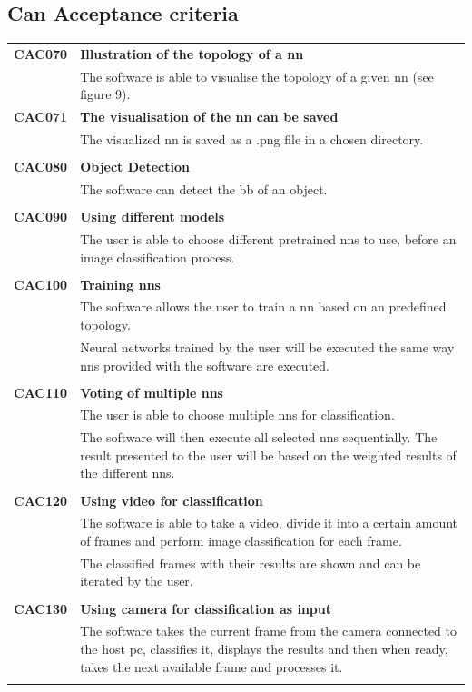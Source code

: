 \documentclass[parskip=full]{scrartcl}
\begin{document}
\subsection{Can Acceptance criteria}
\begin{tabular}{p{2cm}p{11.4cm}}
\textbf{CAC070} \hypertarget{CAC070} & \textbf{Illustration of the topology of a \gls{nn}} \\
& The software is able to visualise the topology of a given \gls{nn} (see figure 9). \\
\textbf{CAC071} \hypertarget{CAC071} & \textbf{The visualisation of the \gls{nn} can be saved}\\
& The visualized \gls{nn} is saved as a .png file in a chosen directory.\\
& \\
\textbf{CAC080} \hypertarget{CAC080} & \textbf{Object Detection} \\
& The software can detect the \gls{bb} of an object. \\ 
& \\
\textbf{CAC090} \hypertarget{CAC090} &  \textbf{Using different models}\\
& The user is able to choose different pretrained \glspl{nn} to use, before an \gls{image classification} process. \\
& \\
\textbf{CAC100} \hypertarget{CAC100} & \textbf{Training \glspl{nn}} \\
& The software allows the user to train a \gls{nn} based on an predefined topology.\\
& Neural networks trained by the user will be executed the same way \glspl{nn} provided with the software are executed.\\
& \\
\textbf{CAC110} \hypertarget{CAC110} & \textbf{Voting of multiple \glspl{nn}} \\
& The user is able to choose multiple \glspl{nn} for classification.\\
& The software will then execute all selected \glspl{nn} sequentially. The result presented to the user will be based on the weighted results of the different \glspl{nn}.\\
& \\
\textbf{CAC120} \hypertarget{CAC120} & \textbf{Using video for classification} \\
& The software is able to take a video, divide it into a certain amount of frames and perform \gls{image classification} for each frame.\\
& The classified frames with their results are shown and can be iterated by the user. \\
& \\
\textbf{CAC130} \hypertarget{CAC130} & \textbf{Using camera for classification as input} \\
& The software takes the current frame from the camera connected to the \gls{host pc}, classifies it, displays the results and then when ready, takes the next available frame and processes it.\\
& \\
\end{tabular}
\end{document}
